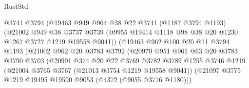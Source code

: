 \begin{lexlean}{RustStd}
\begin{coremodule}
                            @3741
                            @3794
                            (@19463
                              @949
                              @964
                              @38
                              @22
                              @3741
                              (@1187 @3794 @1193)
                              (@21002
                                @949
                                @38
                                @3737
                                @3739
                                (@9955
                                  @19414
                                  @1118
                                  @98
                                  @38
                                  @20
                                  @1230
                                  @1267
                                  @3727
                                  @1219
                                  @19558
                                  @9041))
                              (@19463
                                @962
                                @100
                                @20
                                @11
                                @3794
                                @1193
                                (@21002
                                  @962
                                  @20
                                  @3783
                                  @3792
                                  (@20970
                                    @951
                                    @961
                                    @63
                                    @20
                                    @3783
                                    @3790
                                    @3703
                                    (@20991
                                      @374
                                      @20
                                      @22
                                      @3769
                                      @3782
                                      @3789
                                      @1255
                                      @3746
                                      @1219
                                      (@21004 @3765 @3767 (@21013 @3754 @1219 @19558 @9041))
                                      (@21097
                                        @3775
                                        @1219
                                        @19495
                                        @19590
                                        @9053
                                        (@4372 (@9055 @3776 @1180)))

\end{coremodule}
\end{lexlean}

